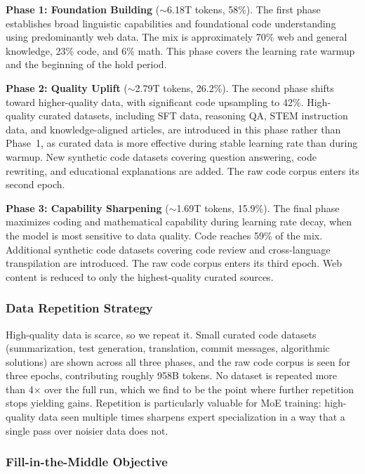\documentclass{llmxive}
\begin{document}
\textbf{Phase 1: Foundation Building} (${\sim}$6.18T tokens, 58\%). The first phase
establishes broad linguistic capabilities and foundational code understanding
using predominantly web data. The mix is approximately 70\% web and general
knowledge, 23\% code, and 6\% math. This phase covers the learning rate warmup
and the beginning of the hold period.

\textbf{Phase 2: Quality Uplift} (${\sim}$2.79T tokens, 26.2\%). The second phase
shifts toward higher-quality data, with significant code upsampling to 42\%.
High-quality curated datasets, including SFT data, reasoning QA, STEM
instruction data, and knowledge-aligned articles, are introduced in this
phase rather than Phase~1, as curated data is more effective during stable
learning rate than during warmup. New synthetic code datasets covering
question answering, code rewriting, and educational explanations are added.
The raw code corpus enters its second epoch.

\textbf{Phase 3: Capability Sharpening} (${\sim}$1.69T tokens, 15.9\%). The final
phase maximizes coding and mathematical capability during learning rate decay,
when the model is most sensitive to data quality. Code reaches 59\% of the mix.
Additional synthetic code datasets covering code review and cross-language
transpilation are introduced. The raw code corpus enters its third epoch.
Web content is reduced to only the highest-quality curated sources.

\subsubsection{Data Repetition Strategy}

High-quality data is scarce, so we repeat it. Small curated code datasets
(summarization, test generation, translation, commit messages, algorithmic
solutions) are shown across all three phases, and the raw code corpus is seen
for three epochs, contributing roughly 958B tokens. No dataset is repeated
more than 4$\times$ over the full run, which we find to be the point where
further repetition stops yielding gains. Repetition is particularly valuable
for MoE training: high-quality data seen multiple times sharpens expert
specialization in a way that a single pass over noisier data does not.

\subsubsection{Fill-in-the-Middle Objective}
\label{sec:fim}
\end{document}
